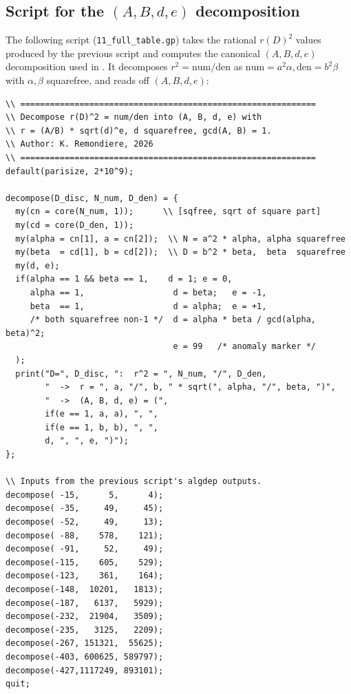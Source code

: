 \documentclass[11pt]{amsart}
\theoremstyle{definition}
\theoremstyle{remark}
\begin{document}
\subsection{Script for the \((A, B, d, e)\) decomposition}

The following script (\verb|11_full_table.gp|) takes the rational
\(r(D)^{2}\) values produced by the previous script and computes the
canonical \((A, B, d, e)\) decomposition used in .
It decomposes
\(r^{2} = \mathrm{num}/\mathrm{den}\) as
\(\mathrm{num} = a^{2} \alpha, \mathrm{den} = b^{2} \beta\) with
\(\alpha, \beta\) squarefree, and reads off \((A, B, d, e)\):

\begin{verbatim}
\\ ============================================================
\\ Decompose r(D)^2 = num/den into (A, B, d, e) with
\\ r = (A/B) * sqrt(d)^e, d squarefree, gcd(A, B) = 1.
\\ Author: K. Remondiere, 2026
\\ ============================================================
default(parisize, 2*10^9);

decompose(D_disc, N_num, D_den) = {
  my(cn = core(N_num, 1));      \\ [sqfree, sqrt of square part]
  my(cd = core(D_den, 1));
  my(alpha = cn[1], a = cn[2]);  \\ N = a^2 * alpha, alpha squarefree
  my(beta  = cd[1], b = cd[2]);  \\ D = b^2 * beta,  beta  squarefree
  my(d, e);
  if(alpha == 1 && beta == 1,    d = 1; e = 0,
     alpha == 1,                  d = beta;   e = -1,
     beta  == 1,                  d = alpha;  e = +1,
     /* both squarefree non-1 */  d = alpha * beta / gcd(alpha, beta)^2;
                                  e = 99   /* anomaly marker */
  );
  print("D=", D_disc, ":  r^2 = ", N_num, "/", D_den,
        "  ->  r = ", a, "/", b, " * sqrt(", alpha, "/", beta, ")",
        "  ->  (A, B, d, e) = (",
        if(e == 1, a, a), ", ",
        if(e == 1, b, b), ", ",
        d, ", ", e, ")");
};

\\ Inputs from the previous script's algdep outputs.
decompose( -15,      5,      4);
decompose( -35,     49,     45);
decompose( -52,     49,     13);
decompose( -88,    578,    121);
decompose( -91,     52,     49);
decompose(-115,    605,    529);
decompose(-123,    361,    164);
decompose(-148,  10201,   1813);
decompose(-187,   6137,   5929);
decompose(-232,  21904,   3509);
decompose(-235,   3125,   2209);
decompose(-267, 151321,  55625);
decompose(-403, 600625, 589797);
decompose(-427,1117249, 893101);
quit;
\end{verbatim}
\end{document}
